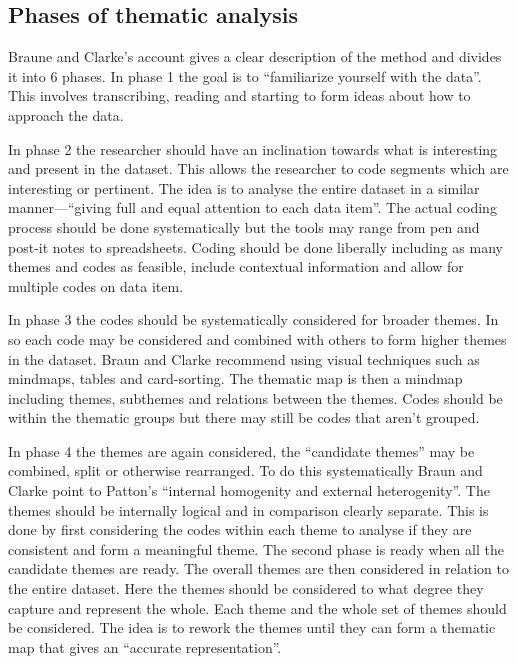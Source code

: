 \documentclass[UKenglish]{uiophd}
\begin{document}
	\subsection{Phases of thematic analysis}

		Braune and Clarke's account gives a clear description of the method and divides it into 6 phases. In phase 1 the goal is to ``familiarize yourself with the data''\cite[p.87]{Braun2006Using}. This involves transcribing, reading and starting to form ideas about how to approach the data. 

		In phase 2 the researcher should have an inclination towards what is interesting and present in the dataset. This allows the researcher to code segments which are interesting or pertinent. The idea is to analyse the entire dataset in a similar manner---``giving full and equal attention to each data item''\cite[p.89]{Braun2006Using}. The actual coding process should be done systematically but the tools may range from pen and post-it notes to spreadsheets. Coding should be done liberally including as many themes and codes as feasible, include contextual information and allow for multiple codes on data item\cite[p.~89]{Braun2006Using}.

		In phase 3 the codes should be systematically considered for broader themes. In so each code may be considered and combined with others to form higher themes in the dataset. Braun and Clarke recommend using visual techniques such as mindmaps, tables and card-sorting. The thematic map is then a mindmap including themes, subthemes and relations between the themes. Codes should be within the thematic groups but there may still be codes that aren't grouped.

		In phase 4 the themes are again considered, the ``candidate themes''\cite[p.91]{Braun2006Using} may be combined, split or otherwise rearranged. To do this systematically Braun and Clarke point to Patton's ``internal homogenity and external heterogenity''\cite[p.91]{Braun2006Using}. The themes should be internally logical and in comparison clearly separate. This is done by first considering the codes within each theme to analyse if they are consistent and form a meaningful theme. The second phase is ready when all the candidate themes are ready. The overall themes are then considered in relation to the entire dataset. Here the themes should be considered to what degree they capture and represent the whole. Each theme and the whole set of themes should be considered. The idea is to rework the themes until they can form a thematic map that gives an ``accurate representation''\cite[p.91]{Braun2006Using}. 
\end{document}
